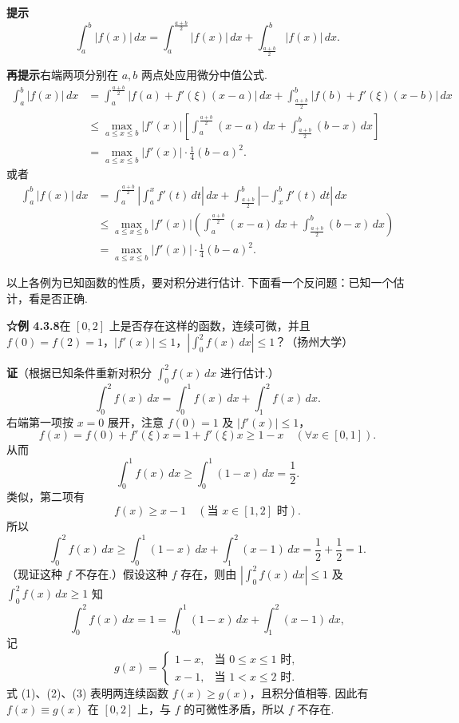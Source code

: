 \documentclass[UTF8, 12pt, fontset=fandol, oneside]{ctexart}
\begin{document}
\noindent\textbf{提示}\quad
\[
\int_a^b|f(x)|\,dx
=\int_a^{\frac{a+b}{2}}|f(x)|\,dx
+\int_{\frac{a+b}{2}}^b|f(x)|\,dx.
\]

\noindent\textbf{再提示}\quad 右端两项分别在 $a,b$ 两点处应用微分中值公式.
\[
\begin{aligned}
\int_a^b|f(x)|\,dx
&=\int_a^{\frac{a+b}{2}}|f(a)+f'(\xi)(x-a)|\,dx
+\int_{\frac{a+b}{2}}^b|f(b)+f'(\xi)(x-b)|\,dx\\
&\le\max_{a\le x\le b}|f'(x)|
\left[\int_a^{\frac{a+b}{2}}(x-a)\,dx
+\int_{\frac{a+b}{2}}^b(b-x)\,dx\right]\\
&=\max_{a\le x\le b}|f'(x)|\cdot\frac14(b-a)^2.
\end{aligned}
\]
或者
\[
\begin{aligned}
\int_a^b|f(x)|\,dx
&=\int_a^{\frac{a+b}{2}}\left|\int_a^x f'(t)\,dt\right|\,dx
+\int_{\frac{a+b}{2}}^b\left|-\int_x^b f'(t)\,dt\right|\,dx\\
&\le\max_{a\le x\le b}|f'(x)|
\left(\int_a^{\frac{a+b}{2}}(x-a)\,dx
+\int_{\frac{a+b}{2}}^b(b-x)\,dx\right)\\
&=\max_{a\le x\le b}|f'(x)|\cdot\frac14(b-a)^2.
\end{aligned}
\]

\noindent 以上各例为已知函数的性质，要对积分进行估计. 下面看一个反问题：已知一个估计，看是否正确.

\noindent\textbf{☆例 4.3.8}\quad 在 $[0,2]$ 上是否存在这样的函数，连续可微，并且 $f(0)=f(2)=1$，$|f'(x)|\le1$，$\left|\int_0^2 f(x)\,dx\right|\le1$？（扬州大学）

\noindent\textbf{证}\quad （根据已知条件重新对积分 $\int_0^2 f(x)\,dx$ 进行估计.）
\[
\int_0^2 f(x)\,dx=\int_0^1 f(x)\,dx+\int_1^2 f(x)\,dx.
\]
右端第一项按 $x=0$ 展开，注意 $f(0)=1$ 及 $|f'(x)|\le1$，
\[
f(x)=f(0)+f'(\xi)x=1+f'(\xi)x\ge1-x\quad(\forall x\in[0,1]).
\tag{1}
\]
从而
\[
\int_0^1 f(x)\,dx\ge\int_0^1(1-x)\,dx=\frac12.
\]
类似，第二项有
\[
f(x)\ge x-1\quad(\text{当 }x\in[1,2]\text{ 时}).
\tag{2}
\]
所以
\[
\int_0^2 f(x)\,dx
\ge\int_0^1(1-x)\,dx+\int_1^2(x-1)\,dx
=\frac12+\frac12=1.
\]
（现证这种 $f$ 不存在.）假设这种 $f$ 存在，则由 $\left|\int_0^2 f(x)\,dx\right|\le1$ 及 $\int_0^2 f(x)\,dx\ge1$ 知
\[
\int_0^2 f(x)\,dx=1
=\int_0^1(1-x)\,dx+\int_1^2(x-1)\,dx,
\tag{3}
\]
记
\[
g(x)=
\begin{cases}
1-x, & \text{当 }0\le x\le1\text{ 时},\\
x-1, & \text{当 }1<x\le2\text{ 时}.
\end{cases}
\]
式 (1)、(2)、(3) 表明两连续函数 $f(x)\ge g(x)$，且积分值相等. 因此有 $f(x)\equiv g(x)$ 在 $[0,2]$ 上，与 $f$ 的可微性矛盾，所以 $f$ 不存在.
\end{document}
